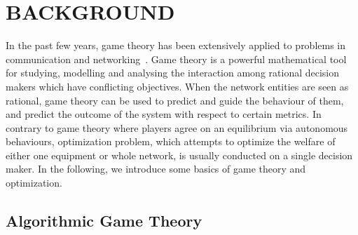 \chapter{BACKGROUND}
\label{background}

In the past few years, game theory has been extensively applied to problems in communication and networking~\cite{Neel06analysisand, Wang_gtc_crn_survey_2010}.
Game theory is a powerful mathematical tool for studying, modelling and analysing the interaction among rational decision makers which have conflicting objectives.
When the network entities are seen as rational, game theory can be used to predict and guide the behaviour of them, and predict the outcome of the system with respect to certain metrics.
In contrary to game theory where players agree on an equilibrium via autonomous behaviours, optimization problem, which attempts to optimize the welfare of either one equipment or whole network, is usually conducted on a single decision maker.
In the following, we introduce some basics of game theory and optimization.





\section{Algorithmic Game Theory}


